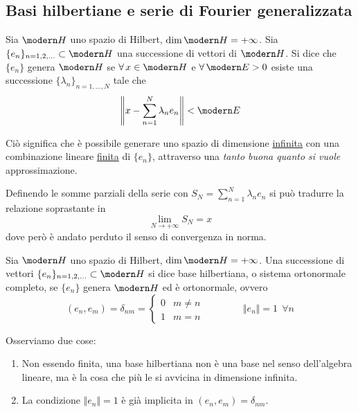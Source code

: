 \newpage


\subsection{Basi hilbertiane e serie di Fourier generalizzata} %
\label{sub:basi_hilbertiane_e_serie_di_fourier_generalizzata}

\begin{defn}
Sia $\Hc$ uno spazio di Hilbert, $\dim \Hc=+\infty$. Sia $\{e_n\}_{n=1,2,\dots}\subset \Hc$ una successione di vettori di $\Hc$. Si dice che $\{e_n\}$ genera $\Hc$ se $\forall x\in \Hc$ e $\forall\Ec>0$ esiste una successione $\{\lambda_n\}_{n=1,\dots,N}$ tale che
$$
\left\|x-\sum_{n=1}^N\lambda_ne_n \right\|<\Ec
$$
\end{defn}
Ciò significa che è possibile generare uno spazio di dimensione \underline{infinita} con una combinazione lineare \underline{finita} di $\{e_n\}$, attraverso una \textit{tanto buona quanto si vuole} approssimazione.

\begin{rem}
Definendo le somme parziali della serie con $S_N=\sum_{n=1}^N\lambda_ne_n$ si può tradurre la relazione soprastante in 
$$
\lim_{N\to+\infty}S_N=x
$$
dove però è andato perduto il senso di convergenza in norma.
\end{rem}

\begin{defn}
Sia $\Hc$ uno spazio di Hilbert, $\dim \Hc=+\infty$. Una successione di vettori $\{e_n\}_{n=1,2,\dots}\subset \Hc$ si dice base hilbertiana, o sistema ortonormale completo, se $\{e_n\}$ genera $\Hc$ ed è ortonormale, ovvero
$$
(e_n,e_m)=\delta_{nm}=
\begin{cases}
0 &m\neq n \\ 1 &m=n
\end{cases} \qquad \qquad \Vert e_n \Vert =1\ \ \forall n
$$
\end{defn}

Osserviamo due cose:
\begin{enumerate}
    \item Non essendo finita, una base hilbertiana non è una base nel senso dell'algebra lineare, ma è la cosa che più le si avvicina in dimensione infinita.
    \item La condizione $\Vert e_n \Vert =1$ è già implicita in $(e_n,e_m)=\delta_{nm}$.
\end{enumerate}

